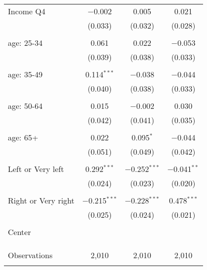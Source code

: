 \begin{tabular}{@{\extracolsep{5pt}}lccc}
 Income Q4 & $-$0.002 & 0.005 & 0.021 \\ 
  & (0.033) & (0.032) & (0.028) \\ 
  & & & \\ 
 age: 25-34 & 0.061 & 0.022 & $-$0.053 \\ 
  & (0.039) & (0.038) & (0.033) \\ 
  & & & \\ 
 age: 35-49 & 0.114$^{***}$ & $-$0.038 & $-$0.044 \\ 
  & (0.040) & (0.038) & (0.033) \\ 
  & & & \\ 
 age: 50-64 & 0.015 & $-$0.002 & 0.030 \\ 
  & (0.042) & (0.041) & (0.035) \\ 
  & & & \\ 
 age: 65+ & 0.022 & 0.095$^{*}$ & $-$0.044 \\ 
  & (0.051) & (0.049) & (0.042) \\ 
  & & & \\ 
 Left or Very left & 0.292$^{***}$ & $-$0.252$^{***}$ & $-$0.041$^{**}$ \\ 
  & (0.024) & (0.023) & (0.020) \\ 
  & & & \\ 
 Right or Very right & $-$0.215$^{***}$ & $-$0.228$^{***}$ & 0.478$^{***}$ \\ 
  & (0.025) & (0.024) & (0.021) \\ 
  & & & \\ 
 Center &  &  &  \\ 
  &  &  &  \\ 
  & & & \\ 
\hline \\[-1.8ex] 

Observations & 2,010 & 2,010 & 2,010 \\ 
\hline 
\hline \\[-1.8ex] 
\end{tabular} 